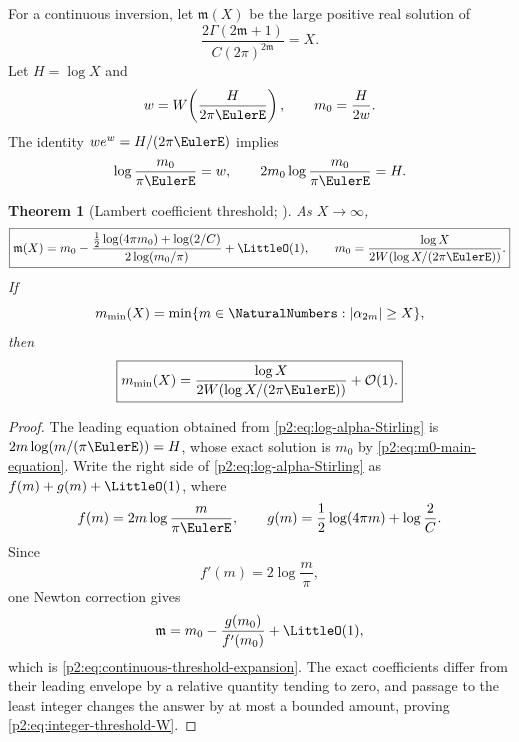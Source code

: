 \documentclass[11pt,oneside]{article}
\numberwithin{equation}{section}
\newtheorem{theorem}{Theorem}[section]
\theoremstyle{definition}
\theoremstyle{remark}
\begin{document}
For a continuous inversion, let $\mathfrak m(X)$ be the large positive real solution of
\begin{equation}
 \frac{2\Gamma(2\mathfrak m+1)}{C(2\pi)^{2\mathfrak m}}=X.
 \label{p2:eq:continuous-threshold}
\end{equation}
Let $H=\log X$ and
\begin{equation}
 w=W\!\left(\frac{H}{2\pi\EulerE}\right),
 \qquad
 m_0=\frac{H}{2w}.
 \label{p2:eq:m0-W}
\end{equation}
The identity $we^w=H/(2\pi\EulerE)$ implies
\begin{equation}
 \log\frac{m_0}{\pi\EulerE}=w,
 \qquad
 2m_0\log\frac{m_0}{\pi\EulerE}=H.
 \label{p2:eq:m0-main-equation}
\end{equation}

\begin{theorem}[Lambert coefficient threshold; \statusnew]
\label{p2:thm:Lambert-threshold}
As $X\to\infty$,
\begin{equation}
 \boxed{
 \mathfrak m(X)
 =m_0-
 \frac{\frac12\log(4\pi m_0)+\log(2/C)}
 {2\log(m_0/\pi)}
 +\LittleO(1),
 \qquad
 m_0=\frac{\log X}{2W(\log X/(2\pi\EulerE))}.
 }
 \label{p2:eq:continuous-threshold-expansion}
\end{equation}
If
\begin{equation}
 m_{\min}(X)=\min\{m\in\NaturalNumbers:|\alpha_{2m}|\ge X\},
 \label{p2:eq:integer-threshold}
\end{equation}
then
\begin{equation}
 \boxed{
 m_{\min}(X)
 =\frac{\log X}{2W(\log X/(2\pi\EulerE))}+\BigO(1).
 }
 \label{p2:eq:integer-threshold-W}
\end{equation}
\end{theorem}

\begin{proof}
The leading equation obtained from \eqref{p2:eq:log-alpha-Stirling} is
$2m\log(m/(\pi\EulerE))=H$, whose exact solution is $m_0$ by
\eqref{p2:eq:m0-main-equation}.  Write the right side of \eqref{p2:eq:log-alpha-Stirling} as
$f(m)+g(m)+\LittleO(1)$, where
\[
 f(m)=2m\log\frac{m}{\pi\EulerE},
 \qquad
 g(m)=\frac12\log(4\pi m)+\log\frac2C.
\]
Since
\begin{equation*}
 f'(m)=2\log\frac m\pi,
\end{equation*}
one Newton correction gives
\[
 \mathfrak m=m_0-\frac{g(m_0)}{f'(m_0)}+\LittleO(1),
\]
which is \eqref{p2:eq:continuous-threshold-expansion}.  The exact coefficients differ from their
leading envelope by a relative quantity tending to zero, and passage to the least integer changes the
answer by at most a bounded amount, proving \eqref{p2:eq:integer-threshold-W}.
\end{proof}
\end{document}
